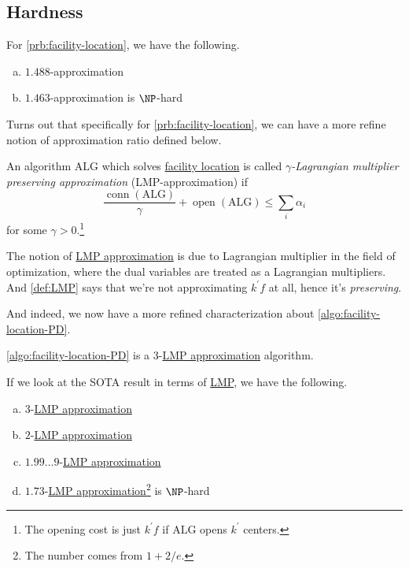 
\subsection{Hardness}
For \autoref{prb:facility-location}, we have the following.
\begin{enumerate}[(a)]
	\item \(1.488\)-approximation~\cite{LI201345}
	\item \(1.463\)-approximation is \(\NP\)-hard~\cite{GUHA1999228}
\end{enumerate}

Turns out that specifically for \autoref{prb:facility-location}, we can have a more refine notion of approximation ratio defined below.

\begin{definition}\label{def:LMP}
	An algorithm \(\mathrm{ALG}\) which solves \hyperref[prb:facility-location]{facility location} is called \emph{\(\gamma \)-Lagrangian multiplier preserving approximation} (LMP-approximation) if
	\[
		\frac{\mathop{\mathrm{conn}}(\mathrm{ALG})}{\gamma }+ \mathop{\mathrm{open}}(\mathrm{ALG}) \leq \sum_{i} \alpha _i
	\]
	for some \(\gamma > 0\).\footnote{The opening cost is just \(k^\prime f\) if \(\mathrm{ALG}\) opens \(k^\prime \) centers.}
\end{definition}
\begin{remark}
	The notion of \hyperref[def:LMP]{LMP approximation} is due to Lagrangian multiplier in the field of optimization, where the dual variables  are treated as a Lagrangian multipliers. And \autoref{def:LMP} says that we're not approximating \(k^\prime f\) at all, hence it's \emph{preserving}.
\end{remark}

And indeed, we now have a more refined characterization about \autoref{algo:facility-location-PD}.

\begin{corollary}
	\autoref{algo:facility-location-PD} is a \(3\)-\hyperref[def:LMP]{LMP approximation} algorithm.
\end{corollary}

\begin{remark}[SOTA]
	If we look at the SOTA result in terms of \hyperref[def:LMP]{LMP}, we have the following.
	\begin{enumerate}[(a)]
		\item \(3\)-\hyperref[def:LMP]{LMP approximation}~\cite{10.1145/375827.375845}
		\item \(2\)-\hyperref[def:LMP]{LMP approximation}~\cite{10.1145/509907.510012}
		\item \(1.99\ldots 9 \)-\hyperref[def:LMP]{LMP approximation}~\cite{https://doi.org/10.48550/arxiv.2207.05150}
		\item \(1.73\)-\hyperref[def:LMP]{LMP approximation}\footnote{The number comes from \(1 + 2 / e\).} is \(\NP\)-hard~\cite{10.1145/509907.510012}
	\end{enumerate}
\end{remark}

